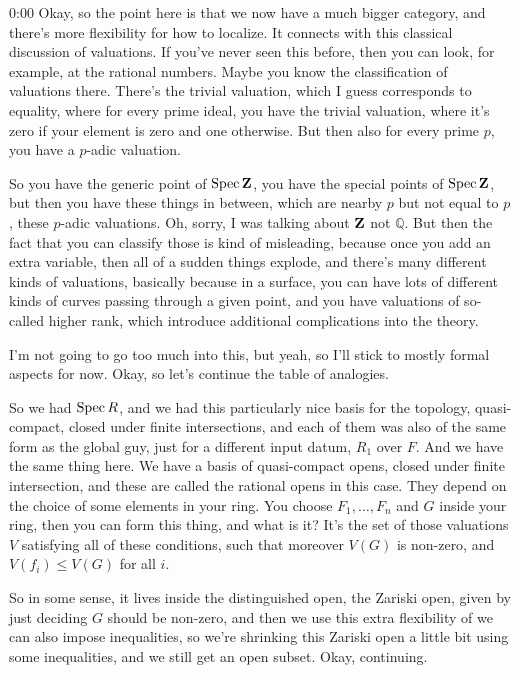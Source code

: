 \begin{unfinished}{0:00}
Okay, so the point here is that we now have a much bigger category, and there's more flexibility for how to localize. It connects with this classical discussion of valuations. If you've never seen this before, then you can look, for example, at the rational numbers. Maybe you know the classification of valuations there. There's the trivial valuation, which I guess corresponds to equality, where for every prime ideal, you have the trivial valuation, where it's zero if your element is zero and one otherwise. But then also for every prime $p$, you have a $p$-adic valuation.

So you have the generic point of $\operatorname{Spec} \mathbf Z$, you have the special points of $\operatorname{Spec} \mathbf Z$, but then you have these things in between, which are nearby $p$ but not equal to $p$, these $p$-adic valuations. Oh, sorry, I was talking about $\mathbf Z$ not $\mathbb{Q}$. But then the fact that you can classify those is kind of misleading, because once you add an extra variable, then all of a sudden things explode, and there's many different kinds of valuations, basically because in a surface, you can have lots of different kinds of curves passing through a given point, and you have valuations of so-called higher rank, which introduce additional complications into the theory. 

I'm not going to go too much into this, but yeah, so I'll stick to mostly formal aspects for now. Okay, so let's continue the table of analogies.

So we had $\operatorname{Spec} R$, and we had this particularly nice basis for the topology, quasi-compact, closed under finite intersections, and each of them was also of the same form as the global guy, just for a different input datum, $R_1$ over $F$. And we have the same thing here. We have a basis of quasi-compact opens, closed under finite intersection, and these are called the rational opens in this case. They depend on the choice of some elements in your ring. You choose $F_1, \dots, F_n$ and $G$ inside your ring, then you can form this thing, and what is it? It's the set of those valuations $V$ satisfying all of these conditions, such that moreover $V(G)$ is non-zero, and $V(f_i) \leq V(G)$ for all $i$.

So in some sense, it lives inside the distinguished open, the Zariski open, given by just deciding $G$ should be non-zero, and then we use this extra flexibility of we can also impose inequalities, so we're shrinking this Zariski open a little bit using some inequalities, and we still get an open subset. Okay, continuing.


\end{unfinished}
